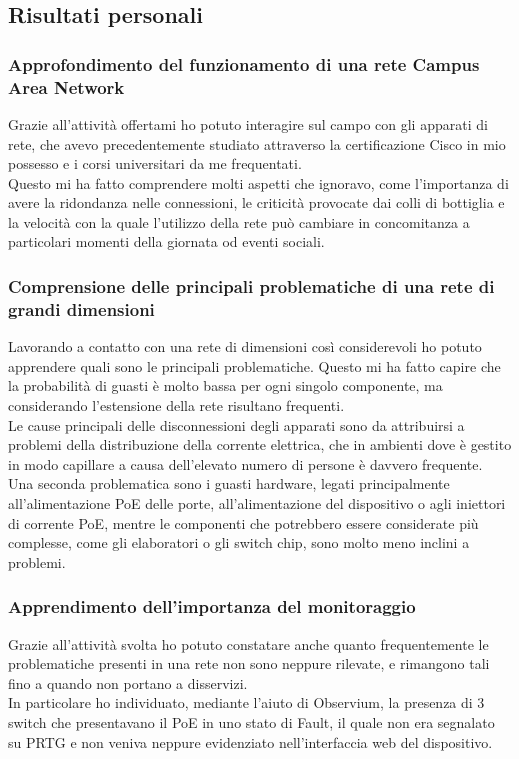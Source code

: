\documentclass[Tesi.tex]{subfiles}
\begin{document}
\newpage
\subsection{Risultati personali}
\subsubsection{Approfondimento del funzionamento di una rete Campus Area Network}
Grazie all'attività offertami ho potuto interagire sul campo con gli apparati di rete, che avevo precedentemente studiato attraverso la certificazione Cisco in mio possesso e i corsi universitari da me frequentati. \\
Questo mi ha fatto comprendere molti aspetti che ignoravo, come l'importanza di avere la ridondanza nelle connessioni, le criticità provocate dai colli di bottiglia e la velocità con la quale l'utilizzo della rete può cambiare in concomitanza a particolari momenti della giornata od eventi sociali.

\subsubsection{Comprensione delle principali problematiche di una rete di grandi dimensioni}
Lavorando a contatto con una rete di dimensioni così considerevoli ho potuto apprendere quali sono le principali problematiche. Questo mi ha fatto capire che la probabilità di guasti è molto bassa per ogni singolo componente, ma considerando l'estensione della rete risultano frequenti. \\
Le cause principali delle disconnessioni degli apparati sono da attribuirsi a problemi della distribuzione della corrente elettrica, che in ambienti dove è gestito in modo capillare a causa dell'elevato numero di persone è davvero frequente. \\
Una seconda problematica sono i guasti hardware, legati principalmente all'alimentazione PoE delle porte, all'alimentazione del dispositivo o agli iniettori di corrente PoE, mentre le componenti che potrebbero essere considerate più complesse, come gli elaboratori o gli switch chip, sono molto meno inclini a problemi.

\subsubsection{Apprendimento dell'importanza del monitoraggio}
Grazie all'attività svolta ho potuto constatare anche quanto frequentemente le problematiche presenti in una rete non sono neppure rilevate, e rimangono tali fino a quando non portano a disservizi. \\
In particolare ho individuato, mediante l'aiuto di Observium, la presenza di 3 switch che presentavano il PoE in uno stato di Fault, il quale non era segnalato su PRTG e non veniva neppure evidenziato nell'interfaccia web del dispositivo.
\end{document}

